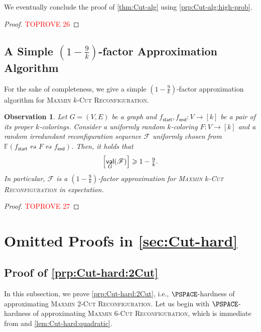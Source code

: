 \documentclass[11pt,fleqn]{article}
\renewcommand{\geq}{\geqslant}
\newcommand{\prb}[1]{\textsc{#1}\xspace}
\newcommand{\reco}{\leftrightsquigarrow}
\let\E\relax\DeclareMathOperator*{\E}{\mathbb{E}}  \let\Pr\relax\DeclareMathOperator*{\Pr}{\mathbb{Pr}}
\DeclareMathOperator{\val}{\mathsf{val}}
\newcommand{\sss}{\mathsf{start}}
\newcommand{\ttt}{\mathsf{end}}
\newcommand{\f}{f}
\newcommand{\frnd}{F}
\newcommand{\sqcol}{\scrF}
\newcommand{\stsqcol}{\bbF}
\newcommand{\MMkCutReconf}{\prb{Maxmin $k$-Cut Reconfiguration}}
\newcommand{\MMtwoCutReconf}{\prb{Maxmin 2-Cut Reconfiguration}}
\newcommand{\MMsixCutReconf}{\prb{Maxmin 6-Cut Reconfiguration}}
\newcommand{\bbF}{\mathbb{F}}
\newcommand{\scrF}{\mathscr{F}}
\let\Pr\relax\DeclareMathOperator*{\Pr}{\mathbb{P}}
\newtheorem{observation}[theorem]{Observation}
\theoremstyle{definition}
\numberwithin{equation}{section}
\begin{document}
We eventually conclude the proof of \cref{thm:Cut-alg} using \cref{prp:Cut-alg:high-prob}.

\begin{proof}\textcolor{red}{TOPROVE 26}\end{proof}


\subsection{A Simple \texorpdfstring{$\left(1-\frac{9}{k}\right)$}{(1-9/k)}-factor Approximation Algorithm}
For the sake of completeness,
we give a simple $\left(1-\frac{9}{k}\right)$-factor approximation algorithm for \MMkCutReconf.

\begin{observation}
\label{obs:Cut-alg:simple}
    Let $G = (V,E)$ be a graph and
    $\f_\sss, \f_\ttt \colon V \to [k]$ be a pair of its proper $k$-colorings.
    Consider a uniformly random $k$-coloring $\frnd \colon V \to [k]$ and
    a random irredundant reconfiguration sequence $\sqcol$
    uniformly chosen from $\stsqcol(\f_\sss \reco \frnd \reco \f_\ttt)$.
    Then, it holds that
    \begin{align}
        \E\Bigl[ \val_G(\sqcol) \Bigr] \geq 1 - \tfrac{9}{k}.
    \end{align}
    In particular,
    $\sqcol$ is a $\left(1-\frac{9}{k}\right)$-factor approximation for
    \MMkCutReconf in expectation.
\end{observation}
\begin{proof}\textcolor{red}{TOPROVE 27}\end{proof}
 
\appendix
\section{Omitted Proofs in \texorpdfstring{\cref{sec:Cut-hard}}{Section~\protect\ref{sec:Cut-hard}}}
\label{app:Cut-hard}


\subsection{Proof of \texorpdfstring{\cref{prp:Cut-hard:2Cut}}{Proposition~\protect\ref{prp:Cut-hard:2Cut}}}
\label{app:Cut-hard:2Cut}
In this subsection, we prove \cref{prp:Cut-hard:2Cut}, i.e.,
$\PSPACE$-hardness of approximating \MMtwoCutReconf.
Let us begin with $\PSPACE$-hardness of approximating \MMsixCutReconf, which is immediate from
\cite{hirahara2024probabilistically,ohsaka2023gap,bonsma2009finding} and \cref{lem:Cut-hard:quadratic}.
\end{document}
